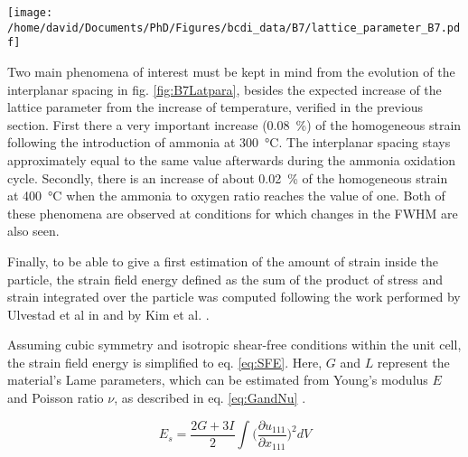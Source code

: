 \begin{SCfigure}
    \centering
    \texttt{[image: /home/david/Documents/PhD/Figures/bcdi\_data/B7/lattice\_parameter\_B7.pdf]}
    \caption{
        Evolution of the interplanar spacing $d_{111}$ and homogeneous strain $\epsilon_{111, homo}$ for particle B as a function of the ammonia to oxygen ratio.
        The reference for the computation of $\epsilon_{111, homo}$ was taken as the mean value at \qty{25}{\degreeCelsius}.
        The reproduction of measurements at fixed conditions yield multiple data points, lines at \qty{300}{\degreeCelsius} and \qty{400}{\degreeCelsius} link the data points in the order of the measurements.
    }
    \label{fig:B7Latpara}
\end{SCfigure}

Two main phenomena of interest must be kept in mind from the evolution of the interplanar spacing in fig. \ref{fig:B7Latpara}, besides the expected increase of the lattice parameter from the increase of temperature, verified in the previous section.
First there a very important increase (\qty{0.08}{\percent}) of the homogeneous strain following the introduction of ammonia at \qty{300}{\degreeCelsius}.
The interplanar spacing stays approximately equal to the same value afterwards during the ammonia oxidation cycle.
Secondly, there is an increase of about \qty{0.02}{\percent} of the homogeneous strain at \qty{400}{\degreeCelsius} when the ammonia to oxygen ratio reaches the value of one.
Both of these phenomena are observed at conditions for which changes in the FWHM are also seen.

Finally, to be able to give a first estimation of the amount of strain inside the particle, the strain field energy defined as the sum of the product of stress and strain integrated over the particle \parencite{Cahn1959} was computed following the work performed by Ulvestad et al in \cite*{Ulvestad2015a} and by Kim et al. \cite*{Kim2019}.

Assuming cubic symmetry and isotropic shear-free conditions within the unit cell, the strain field energy is simplified to eq. \ref{eq:SFE}.
Here, $G$ and $L$ represent the material's Lame parameters, which can be estimated from Young's modulus $E$ and Poisson ratio $\nu$, as described in eq. \ref{eq:GandNu} \parencite{Mavko2020}.

\begin{equation}
    E_s = \frac{2G + 3I}{2} \int \Big( \frac{\partial u_{111}}{\partial x_{111}}\Big)^2 dV
    \label{eq:SFE}
\end{equation}

